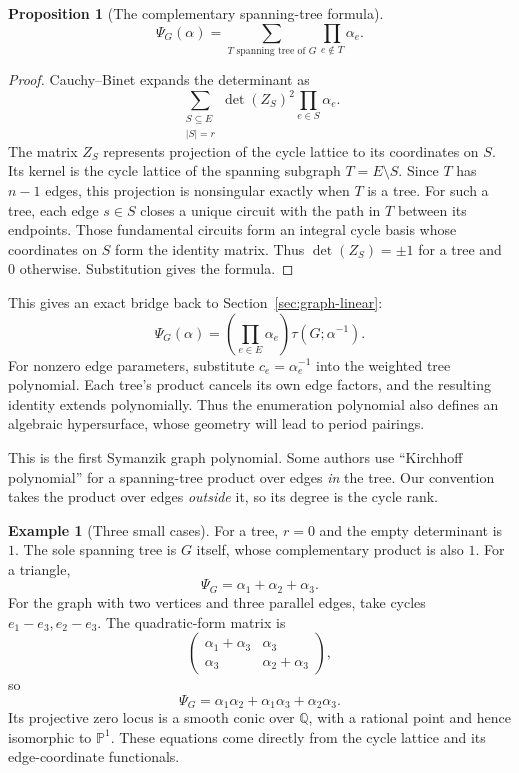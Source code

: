 \documentclass[11pt]{article}
\newtheorem{proposition}[theorem]{Proposition}
\theoremstyle{definition}
\newtheorem{example}[theorem]{Example}
\theoremstyle{remark}
\newcommand{\Q}{\mathbb Q}
\begin{document}
\begin{proposition}[The complementary spanning-tree formula]
\[
  \Psi_G(\alpha)=\sum_{T\text{ spanning tree of }G}
       \prod_{e\notin T}\alpha_e.
\]
\end{proposition}

\begin{proof}
Cauchy--Binet expands the determinant as
\[
  \sum_{\substack{S\subseteq E\\|S|=r}}
       \det(Z_S)^2\prod_{e\in S}\alpha_e.
\]
The matrix $Z_S$ represents projection of the cycle lattice to its
coordinates on $S$.  Its kernel is the cycle lattice of the spanning
subgraph $T=E\setminus S$.  Since $T$ has $n-1$ edges, this projection
is nonsingular exactly when $T$ is a tree.  For such a tree, each edge
$s\in S$ closes a unique circuit with the path in $T$ between its
endpoints.  Those fundamental circuits form an integral cycle basis
whose coordinates on $S$ form the identity matrix.  Thus
$\det(Z_S)=\pm1$ for a tree and $0$ otherwise.  Substitution gives the
formula.
\end{proof}

This gives an exact bridge back to Section~\ref{sec:graph-linear}:
\[
 \Psi_G(\alpha)=\left(\prod_{e\in E}\alpha_e\right)
                  \tau(G;\alpha^{-1}).
\]
For nonzero edge parameters, substitute $c_e=\alpha_e^{-1}$ into the weighted tree polynomial. Each tree's product cancels its own edge factors, and the resulting identity extends polynomially. Thus the enumeration polynomial also defines an algebraic hypersurface, whose geometry will lead to period pairings.

This is the first Symanzik graph polynomial.  Some authors use
``Kirchhoff polynomial'' for a spanning-tree product over edges
\emph{in} the tree.  Our convention takes the product over edges
\emph{outside} it, so its degree is the cycle rank.

\begin{example}[Three small cases]
For a tree, $r=0$ and the empty determinant is $1$.  The sole spanning
tree is $G$ itself, whose complementary product is also $1$.
For a triangle,
\[
  \Psi_G=\alpha_1+\alpha_2+\alpha_3.
\]
For the graph with two vertices and three parallel edges, take cycles
$e_1-e_3,e_2-e_3$.  The quadratic-form matrix is
\[
  \begin{pmatrix}\alpha_1+\alpha_3&\alpha_3\\
                  \alpha_3&\alpha_2+\alpha_3\end{pmatrix},
\]
so
\[
  \Psi_G=\alpha_1\alpha_2+\alpha_1\alpha_3+\alpha_2\alpha_3.
\]
Its projective zero locus is a smooth conic over $\Q$, with a rational
point and hence isomorphic to $\mathbb P^1$.  These equations come
directly from the cycle lattice and its edge-coordinate functionals.
\end{example}
\end{document}
